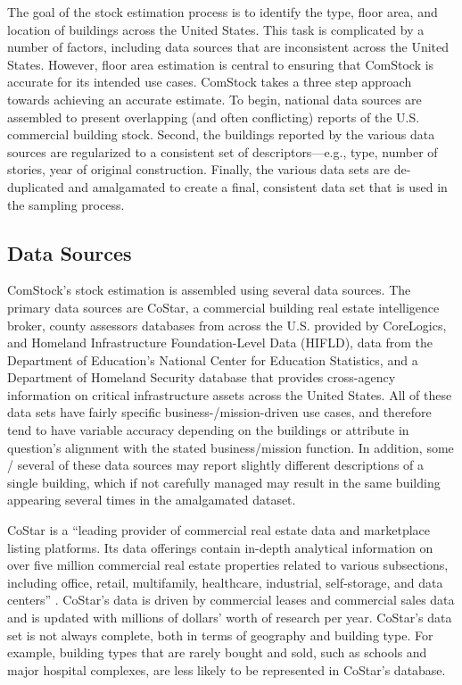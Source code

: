 The goal of the stock estimation process is to identify the type, floor area, and location of buildings across the United States. This task is complicated by a number of factors, including data sources that are inconsistent across the United States. However, floor area estimation is central to ensuring that ComStock is accurate for its intended use cases. ComStock takes a three step approach towards achieving an accurate estimate. To begin, national data sources are assembled to present overlapping (and often conflicting) reports of the U.S. commercial building stock. Second, the buildings reported by the various data sources are regularized to a consistent set of descriptors---e.g., type, number of stories, year of original construction. Finally, the various data sets are de-duplicated and amalgamated to create a final, consistent data set that is used in the sampling process.

\subsection{Data Sources}

ComStock's stock estimation is assembled using several data sources. The primary data sources are CoStar, a commercial building real estate intelligence broker, county assessors databases from across the U.S. provided by CoreLogics, and Homeland Infrastructure Foundation-Level Data (HIFLD), data from the Department of Education's National Center for Education Statistics, and a Department of Homeland Security database that provides cross-agency information on critical infrastructure assets across the United States. All of these data sets have fairly specific business-/mission-driven use cases, and therefore tend to have variable accuracy depending on the buildings or attribute in question's alignment with the stated business/mission function. In addition, some / several of these data sources may report slightly different descriptions of a single building, which if not carefully managed may result in the same building appearing several times in the amalgamated dataset.

CoStar is a ``leading provider of commercial real estate data and marketplace listing platforms. Its data offerings contain in-depth analytical information on over five million commercial real estate properties related to various subsections, including office, retail, multifamily, healthcare, industrial, self-storage, and data centers'' \citep{costar_10k}. CoStar's data is driven by commercial leases and commercial sales data and is updated with millions of dollars' worth of research per year. CoStar's data set is not always complete, both in terms of geography and building type. For example, building types that are rarely bought and sold, such as schools and major hospital complexes, are less likely to be represented in CoStar's database.

